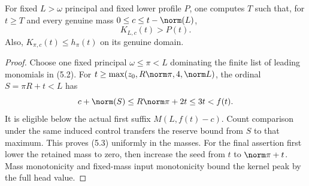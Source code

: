 \documentclass[11pt,a4paper]{article}
\newcommand{\KK}[2]{K_{#1,#2}}
\begin{document}
\begin{lemma}\label{lem:direct}
For fixed $L>\omega$ principal and fixed lower profile $P$, one computes
$T$ such that, for $t\ge T$ and every genuine mass $0\le c\le t-\norm(L)$,
\[
                         \KK Lc(t)>P(t).             \tag{5.3}
\]
Also, $\KK\pi c(t)\le h_\pi(t)$ on its genuine domain.
\end{lemma}
\begin{proof}
Choose one fixed principal $\omega\le\pi<L$ dominating the finite list of
leading monomials in (5.2). For
$t\ge\max(z_0,R\norm\pi,4,\norm L)$, the ordinal $S=\pi R+t<L$ has
\[
             c+\norm(S)\le R\norm\pi+2t\le3t<f(t).
\]
It is eligible below the actual first suffix $M(L,f(t)-c)$. Count
comparison under the same induced control transfers the reserve bound
from $S$ to that maximum. This proves (5.3) uniformly in the masses.
For the final assertion first lower the retained mass to zero, then
increase the seed from $t$ to $\norm\pi+t$. Mass monotonicity and
fixed-mass input monotonicity bound the kernel peak by the full head value.
\end{proof}
\end{document}
